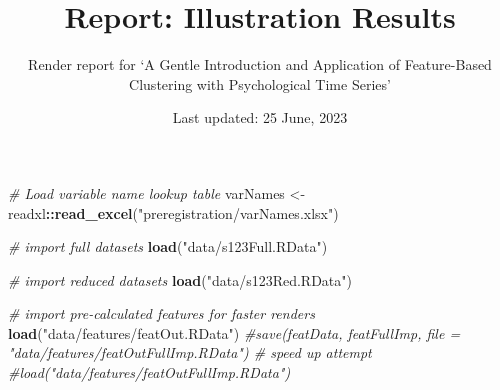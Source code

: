 \documentclass[
]{article}
\title{Report: Illustration Results}
\subtitle{Render report for `A Gentle Introduction and Application of
Feature-Based Clustering with Psychological Time Series'}
\author{}
\date{\vspace{-2.5em}Last updated: 25 June, 2023}
\newenvironment{Shaded}{\begin{snugshade}}{\end{snugshade}}
\newcommand{\CommentTok}[1]{\textcolor[rgb]{0.56,0.35,0.01}{\textit{#1}}}
\newcommand{\FunctionTok}[1]{\textcolor[rgb]{0.13,0.29,0.53}{\textbf{#1}}}
\newcommand{\NormalTok}[1]{#1}
\newcommand{\OtherTok}[1]{\textcolor[rgb]{0.56,0.35,0.01}{#1}}
\newcommand{\SpecialCharTok}[1]{\textcolor[rgb]{0.81,0.36,0.00}{\textbf{#1}}}
\newcommand{\StringTok}[1]{\textcolor[rgb]{0.31,0.60,0.02}{#1}}
\begin{document}
\maketitle

\begin{Shaded}
\begin{Highlighting}[]
\CommentTok{\# Load variable name lookup table}
\NormalTok{varNames }\OtherTok{\textless{}{-}}\NormalTok{ readxl}\SpecialCharTok{::}\FunctionTok{read\_excel}\NormalTok{(}\StringTok{"preregistration/varNames.xlsx"}\NormalTok{)}

\CommentTok{\# import full datasets}
\FunctionTok{load}\NormalTok{(}\StringTok{"data/s123Full.RData"}\NormalTok{)}

\CommentTok{\# import reduced datasets}
\FunctionTok{load}\NormalTok{(}\StringTok{"data/s123Red.RData"}\NormalTok{)}

\CommentTok{\# import pre{-}calculated features for faster renders}
\FunctionTok{load}\NormalTok{(}\StringTok{"data/features/featOut.RData"}\NormalTok{)}
\CommentTok{\#save(featData, featFullImp, file = "data/features/featOutFullImp.RData") \# speed up attempt }
\CommentTok{\#load("data/features/featOutFullImp.RData")}
\end{Highlighting}
\end{Shaded}
\end{document}

